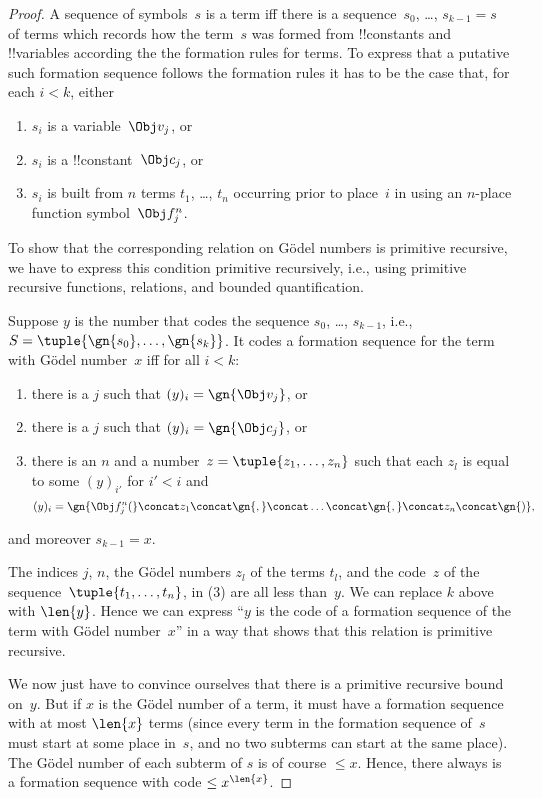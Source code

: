 \documentclass[../../include/open-logic-section]{subfiles}
\begin{document}
\begin{proof}
A sequence of symbols~$s$ is a term iff there is a sequence~$s_0$,
\dots, $s_{k-1} = s$ of terms which records how the term~$s$ was formed
from !!{constant}s and !!{variable}s according the the formation rules
for terms. To express that a putative such formation sequence follows
the formation rules it has to be the case that, for each $i < k$, either
\begin{enumerate}
\item $s_i$ is a variable~$\Obj v_j$, or
\item $s_i$ is a !!{constant}~$\Obj c_j$, or
\item $s_i$ is built from $n$ terms $t_1$, \dots, $t_n$ occurring
  prior to place~$i$ in using an $n$-place function symbol~$\Obj f^n_j$.
\end{enumerate}
To show that the corresponding relation on G\"odel numbers is
primitive recursive, we have to express this condition primitive
recursively, i.e., using primitive recursive functions, relations, and
bounded quantification.

Suppose $y$ is the number that codes the sequence $s_0$, \dots, $s_{k-1}$,
i.e., $S = \tuple{\gn{s_0}, \dots, \gn{s_k}}$.  It codes a formation
sequence for the term with G\"odel number~$x$ iff for all $i < k$:
\begin{enumerate}
\item there is a $j$ such that $(y)_i = \gn{\Obj v_j}$, or
\item there is a $j$ such that $(y)_i = \gn{\Obj c_j}$, or
\item there is an $n$ and a number~$z = \tuple{z_1, \dots, z_n}$ such
  that each $z_l$ is equal to some $(y)_{i'}$ for $i' < i$ and
\[
(y)_i = \gn{\Obj f^n_j(} \concat z_1 \concat \gn{,} \concat \dots
\concat \gn{,} \concat z_n \concat \gn{)},
\]
\end{enumerate}
and moreover $s_{k-1} = x$.

The indices $j$, $n$, the G\"odel numbers $z_l$ of the terms $t_l$,
and the code~$z$ of the sequence~$\tuple{t_1, \dots, t_n}$, in (3) are
all less than~$y$. We can replace $k$ above with $\len{y}$. Hence we
can express ``$y$ is the code of a formation sequence of the term with
G\"odel number~$x$'' in a way that shows that this relation is
primitive recursive.

We now just have to convince ourselves that there is a primitive
recursive bound on~$y$.  But if $x$ is the G\"odel number of a term,
it must have a formation sequence with at most $\len{x}$ terms (since
every term in the formation sequence of~$s$ must start at some place
in~$s$, and no two subterms can start at the same place).  The G\"odel
number of each subterm of $s$ is of course $\le x$. Hence, there
always is a formation sequence with code $\le x^{\len{x}}$.
\end{proof}
\end{document}
